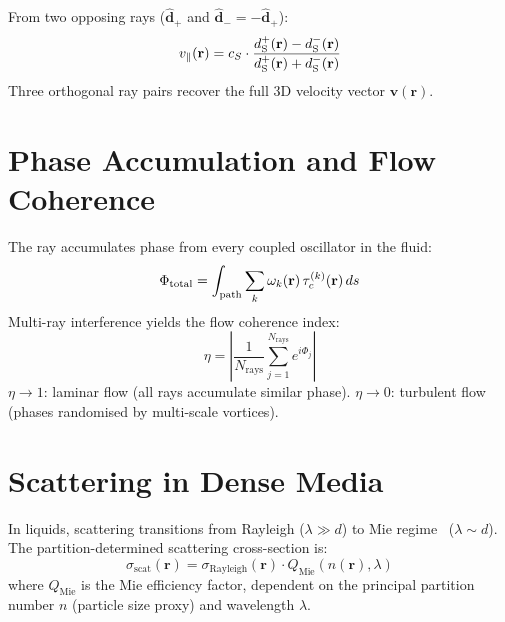 \begin{corollary}
From two opposing rays ($\hat{\mathbf{d}}_+$ and $\hat{\mathbf{d}}_- = -\hat{\mathbf{d}}_+$):
\begin{equation}
    v_\parallel(\mathbf{r}) = c_S \cdot \frac{d_{\mathrm{S}}^+(\mathbf{r}) - d_{\mathrm{S}}^-(\mathbf{r})}{d_{\mathrm{S}}^+(\mathbf{r}) + d_{\mathrm{S}}^-(\mathbf{r})}
\end{equation}
Three orthogonal ray pairs recover the full 3D velocity vector $\mathbf{v}(\mathbf{r})$.
\end{corollary}

\section{Phase Accumulation and Flow Coherence}
\label{sec:coherence}

The ray accumulates phase from every coupled oscillator in the fluid:
\begin{equation}
    \Phi_{\mathrm{total}} = \int_{\mathrm{path}} \sum_k \omega_k(\mathbf{r})\, \tau_c^{(k)}(\mathbf{r})\, ds
\end{equation}
Multi-ray interference yields the flow coherence index:
\begin{equation}
    \eta = \left|\frac{1}{N_{\mathrm{rays}}} \sum_{j=1}^{N_{\mathrm{rays}}} e^{i\Phi_j}\right|
\end{equation}
$\eta \to 1$: laminar flow (all rays accumulate similar phase). $\eta \to 0$: turbulent flow (phases randomised by multi-scale vortices).

\section{Scattering in Dense Media}
\label{sec:scattering}

In liquids, scattering transitions from Rayleigh ($\lambda \gg d$) to Mie regime~\cite{mie1908} ($\lambda \sim d$). The partition-determined scattering cross-section is:
\begin{equation}
    \sigma_{\mathrm{scat}}(\mathbf{r}) = \sigma_{\mathrm{Rayleigh}}(\mathbf{r}) \cdot Q_{\mathrm{Mie}}(n(\mathbf{r}), \lambda)
\end{equation}
where $Q_{\mathrm{Mie}}$ is the Mie efficiency factor, dependent on the principal partition number $n$ (particle size proxy) and wavelength $\lambda$.

